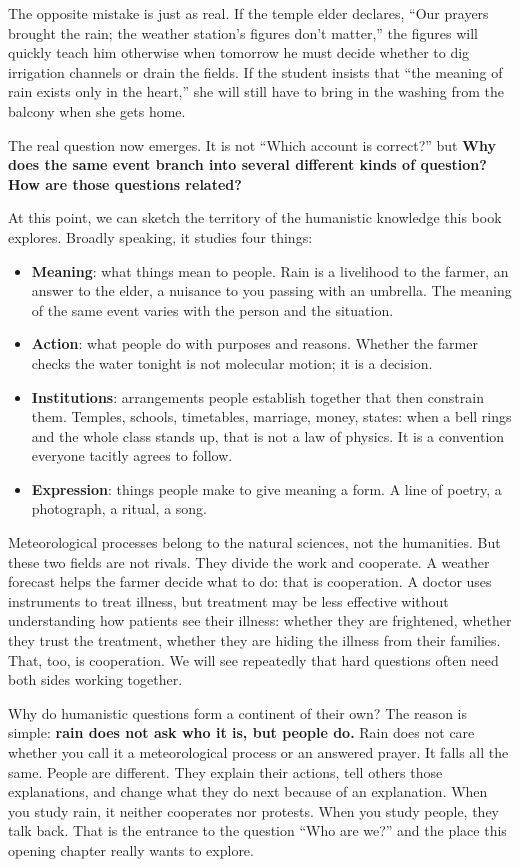 The opposite mistake is just as real. If the temple elder declares, ``Our prayers brought the rain; the weather station's figures don't matter,'' the figures will quickly teach him otherwise when tomorrow he must decide whether to dig irrigation channels or drain the fields. If the student insists that ``the meaning of rain exists only in the heart,'' she will still have to bring in the washing from the balcony when she gets home.

The real question now emerges. It is not ``Which account is correct?'' but \textbf{Why does the same event branch into several different kinds of question? How are those questions related?}

At this point, we can sketch the territory of the humanistic knowledge this book explores. Broadly speaking, it studies four things:

\begin{itemize}
\item \textbf{Meaning}: what things mean to people. Rain is a livelihood to the farmer, an answer to the elder, a nuisance to you passing with an umbrella. The meaning of the same event varies with the person and the situation.
\item \textbf{Action}: what people do with purposes and reasons. Whether the farmer checks the water tonight is not molecular motion; it is a decision.
\item \textbf{Institutions}: arrangements people establish together that then constrain them. Temples, schools, timetables, marriage, money, states: when a bell rings and the whole class stands up, that is not a law of physics. It is a convention everyone tacitly agrees to follow.
\item \textbf{Expression}: things people make to give meaning a form. A line of poetry, a photograph, a ritual, a song.
\end{itemize}
Meteorological processes belong to the natural sciences, not the humanities. But these two fields are not rivals. They divide the work and cooperate. A weather forecast helps the farmer decide what to do: that is cooperation. A doctor uses instruments to treat illness, but treatment may be less effective without understanding how patients see their illness: whether they are frightened, whether they trust the treatment, whether they are hiding the illness from their families. That, too, is cooperation. We will see repeatedly that hard questions often need both sides working together.

Why do humanistic questions form a continent of their own? The reason is simple: \textbf{rain does not ask who it is, but people do.} Rain does not care whether you call it a meteorological process or an answered prayer. It falls all the same. People are different. They explain their actions, tell others those explanations, and change what they do next because of an explanation. When you study rain, it neither cooperates nor protests. When you study people, they talk back. That is the entrance to the question ``Who are we?'' and the place this opening chapter really wants to explore.

